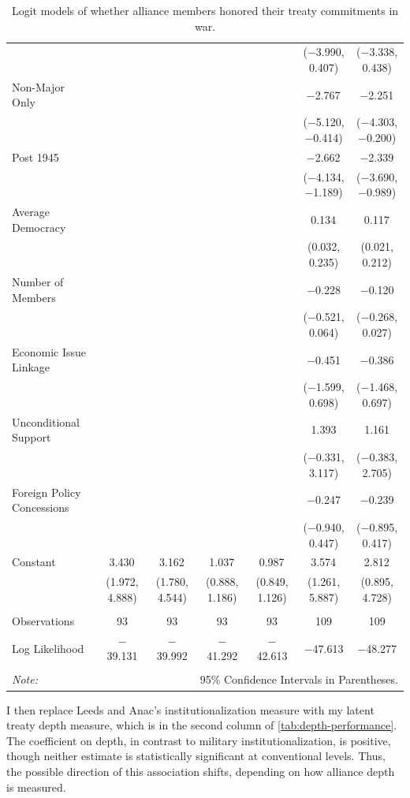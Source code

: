 \documentclass[12pt]{article}
\begin{document}
\begin{table}[!htbp]
\begin{adjustbox}{width= .95\textwidth, center}
\begin{tabular}{@{\extracolsep{5pt}}lcccccc}
  &  &  &  &  & ($-$3.990, 0.407) & ($-$3.338, 0.438) \\ 
  Non-Major Only &  &  &  &  & $-$2.767$^{}$ & $-$2.251$^{}$ \\ 
  &  &  &  &  & ($-$5.120, $-$0.414) & ($-$4.303, $-$0.200) \\ 
  Post 1945 &  &  &  &  & $-$2.662$^{}$ & $-$2.339$^{}$ \\ 
  &  &  &  &  & ($-$4.134, $-$1.189) & ($-$3.690, $-$0.989) \\ 
  Average Democracy &  &  &  &  & 0.134$^{}$ & 0.117$^{}$ \\ 
  &  &  &  &  & (0.032, 0.235) & (0.021, 0.212) \\ 
  Number of Members &  &  &  &  & $-$0.228 & $-$0.120 \\ 
  &  &  &  &  & ($-$0.521, 0.064) & ($-$0.268, 0.027) \\ 
  Economic Issue Linkage &  &  &  &  & $-$0.451 & $-$0.386 \\ 
  &  &  &  &  & ($-$1.599, 0.698) & ($-$1.468, 0.697) \\ 
  Unconditional Support &  &  &  &  & 1.393 & 1.161 \\ 
  &  &  &  &  & ($-$0.331, 3.117) & ($-$0.383, 2.705) \\ 
  Foreign Policy Concessions &  &  &  &  & $-$0.247 & $-$0.239 \\ 
  &  &  &  &  & ($-$0.940, 0.447) & ($-$0.895, 0.417) \\ 
  Constant & 3.430$^{}$ & 3.162$^{}$ & 1.037$^{}$ & 0.987$^{}$ & 3.574$^{}$ & 2.812$^{}$ \\ 
  & (1.972, 4.888) & (1.780, 4.544) & (0.888, 1.186) & (0.849, 1.126) & (1.261, 5.887) & (0.895, 4.728) \\ 
 \hline \\[-1.8ex] 
Observations & 93 & 93 & 93 & 93 & 109 & 109 \\ 
Log Likelihood & $-$39.131 & $-$39.992 & $-$41.292 & $-$42.613 & $-$47.613 & $-$48.277 \\ 
\hline 
\hline \\[-1.8ex] 
\textit{Note:}  & \multicolumn{6}{r}{95\% Confidence Intervals in Parentheses.} \\ 
\end{tabular} 
\end{adjustbox} 
  \caption{Logit models of whether alliance members honored their treaty commitments in war.} 
  \label{tab:depth-performance}  
\end{table} 


I then replace Leeds and Anac's institutionalization measure with my latent treaty depth measure, which is in the second column of \autoref{tab:depth-performance}. 
The coefficient on depth, in contrast to military institutionalization, is positive, though neither estimate is statistically significant at conventional levels. 
Thus, the possible direction of this association shifts, depending on how alliance depth is measured.
\end{document}
